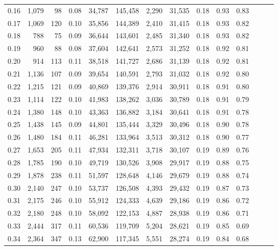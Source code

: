 \begin{tabular}{rrrrrrrrrrrrrr}
0.16 &  1,079 &   98 &  0.08 &   34,787 &  145,458 &   2,290 &  31,535 &  0.18 &  0.93 &      0.83 \\
0.17 &  1,069 &  120 &  0.10 &   35,856 &  144,389 &   2,410 &  31,415 &  0.18 &  0.93 &      0.82 \\
0.18 &    788 &   75 &  0.09 &   36,644 &  143,601 &   2,485 &  31,340 &  0.18 &  0.93 &      0.82 \\
0.19 &    960 &   88 &  0.08 &   37,604 &  142,641 &   2,573 &  31,252 &  0.18 &  0.92 &      0.81 \\
0.20 &    914 &  113 &  0.11 &   38,518 &  141,727 &   2,686 &  31,139 &  0.18 &  0.92 &      0.81 \\
0.21 &  1,136 &  107 &  0.09 &   39,654 &  140,591 &   2,793 &  31,032 &  0.18 &  0.92 &      0.80 \\
0.22 &  1,215 &  121 &  0.09 &   40,869 &  139,376 &   2,914 &  30,911 &  0.18 &  0.91 &      0.80 \\
0.23 &  1,114 &  122 &  0.10 &   41,983 &  138,262 &   3,036 &  30,789 &  0.18 &  0.91 &      0.79 \\
0.24 &  1,380 &  148 &  0.10 &   43,363 &  136,882 &   3,184 &  30,641 &  0.18 &  0.91 &      0.78 \\
0.25 &  1,438 &  145 &  0.09 &   44,801 &  135,444 &   3,329 &  30,496 &  0.18 &  0.90 &      0.78 \\
0.26 &  1,480 &  184 &  0.11 &   46,281 &  133,964 &   3,513 &  30,312 &  0.18 &  0.90 &      0.77 \\
0.27 &  1,653 &  205 &  0.11 &   47,934 &  132,311 &   3,718 &  30,107 &  0.19 &  0.89 &      0.76 \\
0.28 &  1,785 &  190 &  0.10 &   49,719 &  130,526 &   3,908 &  29,917 &  0.19 &  0.88 &      0.75 \\
0.29 &  1,878 &  238 &  0.11 &   51,597 &  128,648 &   4,146 &  29,679 &  0.19 &  0.88 &      0.74 \\
0.30 &  2,140 &  247 &  0.10 &   53,737 &  126,508 &   4,393 &  29,432 &  0.19 &  0.87 &      0.73 \\
0.31 &  2,175 &  246 &  0.10 &   55,912 &  124,333 &   4,639 &  29,186 &  0.19 &  0.86 &      0.72 \\
0.32 &  2,180 &  248 &  0.10 &   58,092 &  122,153 &   4,887 &  28,938 &  0.19 &  0.86 &      0.71 \\
0.33 &  2,444 &  317 &  0.11 &   60,536 &  119,709 &   5,204 &  28,621 &  0.19 &  0.85 &      0.69 \\
0.34 &  2,364 &  347 &  0.13 &   62,900 &  117,345 &   5,551 &  28,274 &  0.19 &  0.84 &      0.68 \\

\end{tabular}
